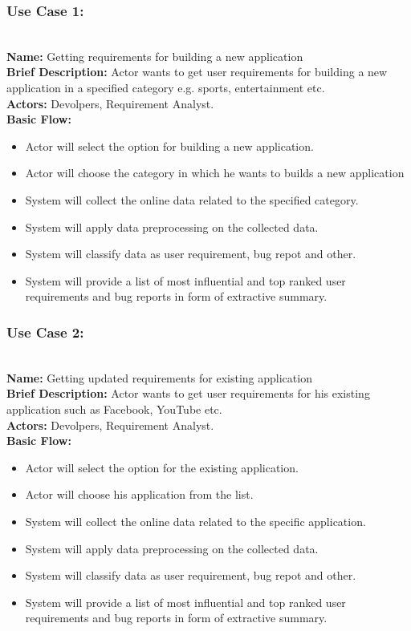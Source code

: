 \subsubsection {Use Case 1:}
\textbf {\\ Name:} Getting requirements for building a new application\\
\textbf{Brief Description:} Actor wants to get user requirements for building a new application in a specified category e.g. sports, entertainment etc.\\
\textbf{Actors: } Devolpers, Requirement Analyst.\\
\textbf{Basic Flow:}
\begin {itemize}
\item{Actor will select the option for building a new application.}
\item{Actor will choose the category in which he wants to builds a new application}
\item{System will collect the online data related to the specified category.}
\item{System will apply data preprocessing on the collected data.}
\item{System will classify data as user requirement, bug repot and other.}
\item{System will provide a list of most influential and top ranked user requirements and bug reports in form of extractive summary.}
\end{itemize}
\subsubsection {Use Case 2:}

\textbf {\\ Name:} Getting updated requirements for existing application\\
\textbf{Brief Description:} Actor wants to get user requirements for his existing application such as Facebook, YouTube etc.\\
\textbf{Actors: } Devolpers, Requirement Analyst.\\
\textbf{Basic Flow:}
\begin {itemize}
\item{Actor will select the option for the existing application.}
\item{Actor will choose his application from the list.}
\item{System will collect the online data related to the specific application. }
\item{System will apply data preprocessing on the collected data.}
\item{System will classify data as user requirement, bug repot and other.}
\item{System will provide a list of most influential and top ranked user requirements and bug reports in form of extractive summary.}
\end{itemize}

